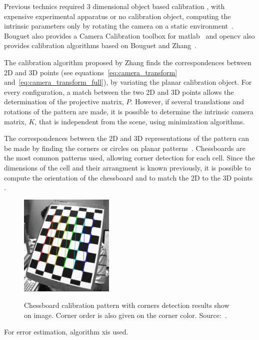 Previous technics required 3 dimensional object based calibration \citeneeded, with expensive experimental apparatus or no calibration object, computing the intrinsic parameters only by rotating the camera on a static environment~\citeneeded. Bouguet also provides a Camera Calibration toolbox for \ac{matlab}~\cite{Jean_Yves} and \ac{opencv} also provides calibration algorithms based on Bouguet and Zhang~\cite{opencv}.

The calibration algorithm proposed by Zhang finds the correspondences between 2D and 3D points (see equations~\ref{eq:camera_transform} and~\ref{eq:camera_transform_full}), by variating the planar calibration object. For every configuration, a match between the two 2D and 3D points allows the determination of the projective matrix, $P$. However, if several translations and rotations of the pattern are made, it is possible to determine the intrinsic camera matrix, $K$, that is independent from the scene, using minimization algorithms. 

The correspondences between the 2D and 3D representations of the pattern can be made by finding the corners or circles on planar patterns~\citeneeded. Chessboards are the most common patterns used, allowing corner detection for each cell. Since the dimensions of the cell and their arrangment is known previously, it is possible to compute the orientation of the chessboard and to match the 2D to the 3D points \cite{Zhengyou2000, opencv_doc, mvg_book}.

\begin{figure}[H]
	\centering
	\includegraphics[width=0.4\textwidth, keepaspectratio]{img/camera/calib_pattern.jpg}
	\label{fig:opencv_calib_pattern}
	\caption{Chessboard calibration pattern with corners detection results show on image. Corner order is also given on the corner color. Source:~\cite{OpenCV_camera_calib}.}
\end{figure}

For error estimation, algorithm x\todo is used.

